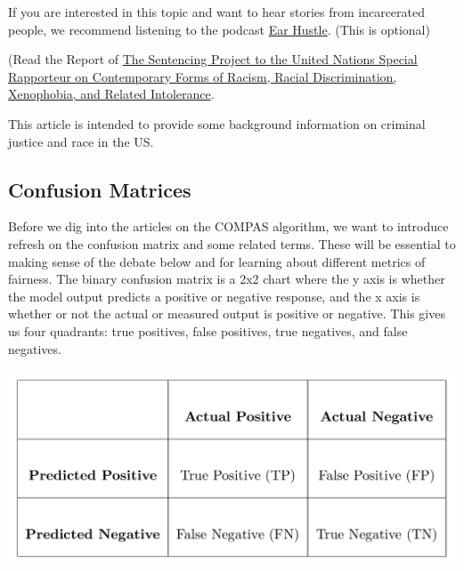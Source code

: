 \documentclass[assignment02_Solutions]{subfiles}
\begin{document}
If you are interested in this topic and want to hear stories from incarcerated people, we recommend listening to the podcast \href{https://www.earhustlesq.com/}{Ear Hustle}. (This is optional) 


\begin{exercise}
\bes
\item (Read the Report of \href{https://www.sentencingproject.org/publications/un-report-on-racial-disparities/}{The Sentencing Project to the United Nations Special Rapporteur on Contemporary Forms of Racism, Racial Discrimination, Xenophobia, and Related Intolerance}. 

This article is intended to provide some background information on criminal justice and race in the US. 
\ees
\end{exercise}



\subsection{Confusion Matrices}
Before we dig into the articles on the COMPAS algorithm, we want to introduce \/ refresh on the confusion matrix and some related terms. These will be essential to making sense of the debate below and for learning about different metrics of fairness. The binary confusion matrix is a 2x2 chart where the y axis is whether the model output predicts a positive or negative response, and the x axis is whether or not the actual or measured output is positive or negative. This gives us four quadrants: true positives, false positives, true negatives, and false negatives.\\

\begin{center}
\includegraphics[width=0.5\linewidth]{figures/confusion}
\end{center}
\end{document}
